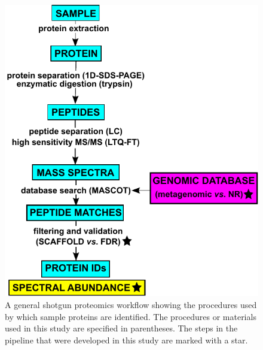 \begin{figure}
\centering
\includegraphics[width=\textwidth]{ace_figures/workflow.pdf}
\caption[General shotgun proteomics workflow]{A general shotgun proteomics workflow showing the procedures used by which sample proteins are identified. The procedures or materials used in this study are specified in parentheses. The steps in the pipeline that were developed in this study are marked with a star.
}
\label{fig:workflow}

\end{figure}
